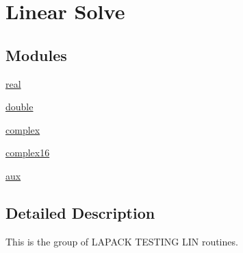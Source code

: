 \hypertarget{group__lin}{}\section{Linear Solve}
\label{group__lin}
\subsection*{Modules}
\begin{DoxyCompactItemize}
\item 
\hyperlink{group__single__lin}{real}
\item 
\hyperlink{group__double__lin}{double}
\item 
\hyperlink{group__complex__lin}{complex}
\item 
\hyperlink{group__complex16__lin}{complex16}
\item 
\hyperlink{group__aux__lin}{aux}
\end{DoxyCompactItemize}


\subsection{Detailed Description}
This is the group of L\+A\+P\+A\+C\+K T\+E\+S\+T\+I\+N\+G L\+I\+N routines. 